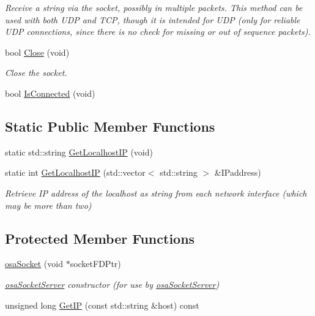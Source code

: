 \begin{DoxyCompactItemize}
\begin{DoxyCompactList}\small\item\em Receive a string via the socket, possibly in multiple packets. This method can be used with both U\+D\+P and T\+C\+P, though it is intended for U\+D\+P (only for reliable U\+D\+P connections, since there is no check for missing or out of sequence packets). \end{DoxyCompactList}\item 
bool \hyperlink{classosa_socket_acaf1869eba7f202d3955bdd58de79503}{Close} (void)
\begin{DoxyCompactList}\small\item\em Close the socket. \end{DoxyCompactList}\item 
bool \hyperlink{classosa_socket_aabe0c123217596854f4f912b04d4e2f2}{Is\+Connected} (void)
\end{DoxyCompactItemize}
\subsection*{Static Public Member Functions}
\begin{DoxyCompactItemize}
\item 
static std\+::string \hyperlink{classosa_socket_a733e1bbf1236424b9345c56d4436b9f4}{Get\+Localhost\+I\+P} (void)
\item 
static int \hyperlink{classosa_socket_a4819601ae4e72f6695dc61781b4fc73c}{Get\+Localhost\+I\+P} (std\+::vector$<$ std\+::string $>$ \&I\+Paddress)
\begin{DoxyCompactList}\small\item\em Retrieve I\+P address of the localhost as string from each network interface (which may be more than two) \end{DoxyCompactList}\end{DoxyCompactItemize}
\subsection*{Protected Member Functions}
\begin{DoxyCompactItemize}
\item 
\hyperlink{classosa_socket_ad52fa55231168bf731ed495cc89405ff}{osa\+Socket} (void $\ast$socket\+F\+D\+Ptr)
\begin{DoxyCompactList}\small\item\em \hyperlink{classosa_socket_server}{osa\+Socket\+Server} constructor (for use by \hyperlink{classosa_socket_server}{osa\+Socket\+Server}) \end{DoxyCompactList}\item 
unsigned long \hyperlink{classosa_socket_a98e6b0d1fe72490b6163fa439c27a10b}{Get\+I\+P} (const std\+::string \&host) const 
\end{DoxyCompactItemize}

